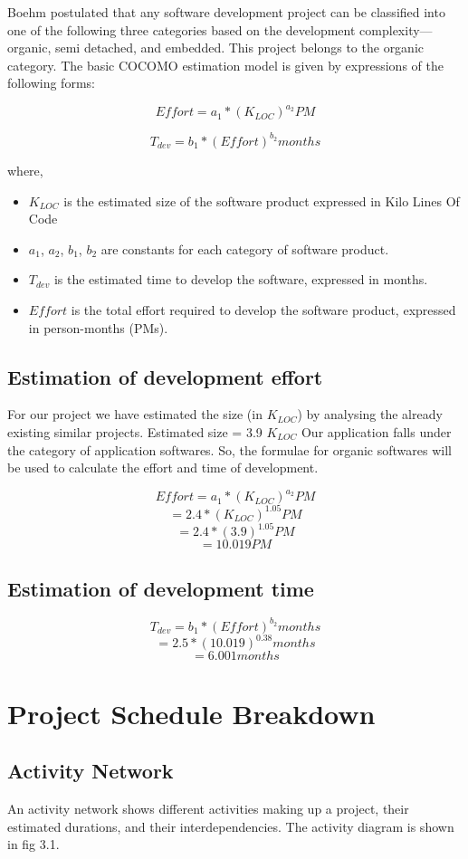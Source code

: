 \documentclass[12pt]{report}
\begin{document}
Boehm postulated that any software development project can be classified into one of the following three categories based on the development complexity—organic, semi detached, and embedded. This project belongs to the organic category. The basic COCOMO estimation model is given by expressions of the following forms:

\[ Effort = a_1 * (K_{LOC})^{a_2} PM \]

\[ T_{dev} = b_1 * (Effort)^{b_2} months \]

where, 
\begin{itemize}
    \item $K_{LOC}$ is the estimated size of the software product expressed in Kilo Lines Of Code
    \item $a_1$, $a_2$, $b_1$, $b_2$ are constants for each category of software product.
    \item $T_{dev}$ is the estimated time to develop the software, expressed in months.
    \item $Effort$ is the total effort required to develop the software product, expressed
in person-months (PMs).
\end{itemize}

\section{Estimation of development effort}
For our project we have estimated the size (in $K_{LOC}$) by analysing the already existing similar projects.
Estimated size = 3.9 $K_{LOC}$
Our application falls under the category of application softwares. So, the formulae for organic softwares will be used to calculate the effort and time of development.

\[ Effort = a_1 * (K_{LOC})^{a_2} PM \]
\[ = 2.4 * (K_{LOC})^{1.05} PM \]
\[ = 2.4 * (3.9)^{1.05} PM \]
\[ = 10.019 PM \]

\section{Estimation of development time}
\[ T_{dev} = b_1 * (Effort)^{b_2} months \]
\[ = 2.5 * (10.019)^{0.38} months \]
\[ = 6.001 months \]

\chapter{Project Schedule Breakdown}

\section{Activity Network}
An activity network shows different activities making up a project, their estimated durations, and their interdependencies. The activity diagram is shown in fig 3.1.
\end{document}
